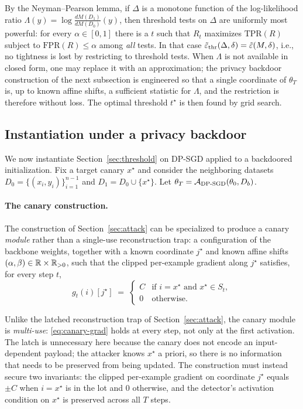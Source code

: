 By the Neyman--Pearson lemma, if $\Delta$ is a monotone function of the log-likelihood ratio $\Lambda(y) = \log \frac{dM(D_1)}{dM(D_0)}(y)$, then threshold tests on $\Delta$ are uniformly most powerful: for every $\alpha \in [0, 1]$ there is a $t$ such that $R_t$ maximizes $\mathrm{TPR}(R)$ subject to $\mathrm{FPR}(R) \leq \alpha$ among \emph{all} tests. In that case $\tilde{\varepsilon}_{\mathrm{thr}}(\Delta, \delta) = \tilde{\varepsilon}(M, \delta)$, i.e., no tightness is lost by restricting to threshold tests. When $\Lambda$ is not available in closed form, one may replace it with an approximation; the privacy backdoor construction of the next subsection is engineered so that a single coordinate of $\theta_T$ is, up to known affine shifts, a sufficient statistic for $\Lambda$, and the restriction is therefore without loss. The optimal threshold $t^\star$ is then found by grid search.

\subsection{Instantiation under a privacy backdoor}
\label{sec:instantiation}

We now instantiate Section~\ref{sec:threshold} on DP-SGD applied to a backdoored initialization. Fix a target canary $x^\star$ and consider the neighboring datasets $D_0 = \{(x_i, y_i)\}_{i=1}^{n-1}$ and $D_1 = D_0 \cup \{x^\star\}$. Let $\theta_T = \mathcal{A}_{\mathrm{DP\text{-}SGD}}(\theta_0, D_b)$.

\paragraph{The canary construction.} The construction of
Section~\ref{sec:attack} can be specialized to produce a canary \emph{module} rather than a single-use reconstruction trap: a configuration of the backbone weights, together with a known coordinate $j^\star$ and known affine shifts $(\alpha, \beta) \in \mathbb{R} \times \mathbb{R}_{>0}$, such that the clipped per-example gradient along $j^\star$ satisfies, for every step $t$,
\begin{equation}
  g_t(i)[j^\star] \;=\;
  \begin{cases}
    C & \text{if } i = x^\star \text{ and } x^\star \in S_t, \\
    0 & \text{otherwise}.
  \end{cases}
  \label{eq:canary-grad}
\end{equation}

Unlike the latched reconstruction trap of Section~\ref{sec:attack}, the canary module is \emph{multi-use}: \eqref{eq:canary-grad} holds at every step, not only at the first activation. The latch is unnecessary here because the canary does not encode an input-dependent payload; the attacker knows $x^\star$ a priori, so there is no information that needs to be preserved from being updated. The construction must instead secure two invariants: the clipped per-example gradient on coordinate $j^\star$ equals $\pm C$ when $i = x^\star$ is in the lot and $0$ otherwise, and the detector's activation condition on $x^\star$ is preserved across all $T$ steps.

